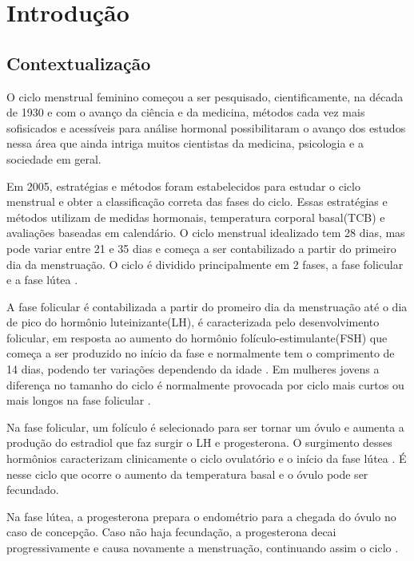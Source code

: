 \chapter*[Introdução]{Introdução}

\section{Contextualização}

O ciclo menstrual feminino começou a ser pesquisado, cientificamente, na década de 1930 \cite{frank1931} e com o avanço da ciência e da medicina, métodos cada vez mais sofisicados e acessíveis para análise hormonal possibilitaram o avanço dos estudos nessa área que ainda intriga muitos cientistas da medicina, psicologia e a sociedade em geral.

Em 2005, estratégias e métodos foram estabelecidos para estudar o ciclo menstrual e obter a classificação correta das fases do ciclo\cite{becker2005}. Essas estratégias e métodos utilizam de medidas hormonais, temperatura corporal basal(TCB) e avaliações baseadas em calendário. O ciclo menstrual idealizado tem 28 dias, mas pode variar entre 21 e 35 dias \cite{lenton1984a} e começa a ser contabilizado a partir do primeiro dia da menstruação. O ciclo é dividido principalmente em 2 fases, a fase folicular e a fase lútea \cite{brondin2008}.

A fase folicular é contabilizada a partir do promeiro dia da menstruação até o dia de pico do hormônio luteinizante(LH), é caracterizada pelo desenvolvimento folicular, em resposta ao aumento do hormônio folículo-estimulante(FSH) que começa a ser produzido no início da fase e normalmente tem o comprimento de 14 dias, podendo ter variações dependendo da idade \cite{lenton1984a}. Em mulheres jovens a diferença no tamanho do ciclo é normalmente provocada por ciclo mais curtos ou mais longos na fase folicular \cite{lenton1984a}.

Na fase folicular, um folículo é selecionado para ser tornar um óvulo e aumenta a produção do estradiol que faz surgir o LH e progesterona. O surgimento desses hormônios caracterizam clinicamente o ciclo ovulatório e o início da fase lútea \cite{fritz2010}. É nesse ciclo que ocorre o aumento da temperatura basal e o óvulo pode ser fecundado. 

Na fase lútea, a progesterona prepara o endométrio para a chegada do óvulo no caso de concepção. Caso não haja fecundação, a progesterona decai progressivamente e causa novamente a menstruação, continuando assim o ciclo \cite{nikas2003}.

